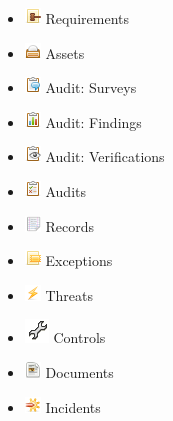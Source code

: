 \documentclass[a4paper,10pt]{book}
\begin{document}
\begin{itemize}
\item \includegraphics[height=2ex]{Icon/16-paper-gavel-alt.png} Requirements
\item \includegraphics[height=2ex]{Icon/Asset.png} Assets
\item \includegraphics[height=2ex]{Icon/Clipboard_comment.png} Audit: Surveys
\item \includegraphics[height=2ex]{Icon/Clipboard_report.png} Audit: Findings
\item \includegraphics[height=2ex]{Icon/Clipboard_eye.png} Audit: Verifications
\item \includegraphics[height=2ex]{Icon/Clipboard_audit.png} Audits
\item \includegraphics[height=2ex]{Icon/Text.png} Records
\item \includegraphics[height=2ex]{Icon/16-paper-excerpt-yellow.png} Exceptions
\item \includegraphics[height=2ex]{Icon/Lightening.png} Threats
\item \includegraphics[height=2ex]{Icon/Controls.png} Controls
\item \includegraphics[height=2ex]{Icon/Document.png} Documents
\item \includegraphics[height=2ex]{Icon/Incident.png} Incidents

\end{itemize}
\end{document}
